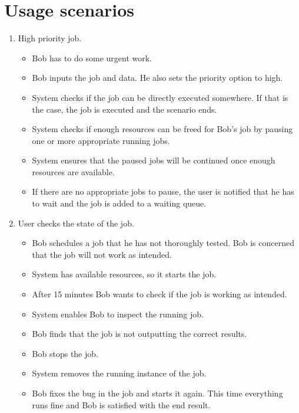 \section{Usage scenarios}
\begin{enumerate}
  \item High priority job.
  \begin{itemize}
    \item Bob has to do some urgent work.
    \item Bob inputs the job and data. He also sets the priority option to high.
    \item System checks if the job can be directly executed somewhere.
    If that is the case, the job is executed and the scenario ends.
    \item System checks if enough resources can be freed for Bob's job by pausing one or more appropriate running jobs.
    \item System ensures that the paused jobs will be continued once enough resources are available.
    \item If there are no appropriate jobs to pause, the user is notified that he has to wait and the job is added to a waiting queue.
  \end{itemize}
  \item User checks the state of the job.
  \begin{itemize}
    \item Bob schedules a job that he has not thoroughly tested.
    Bob is concerned that the job will not work as intended.
    \item System has available resources, so it starts the job.
    \item After 15 minutes Bob wants to check if the job is working as intended.
    \item System enables Bob to inspect the running job.
    \item Bob finds that the job is not outputting the correct results.
    \item Bob stops the job.
    \item System removes the running instance of the job.
    \item Bob fixes the bug in the job and starts it again.
    This time everything runs fine and Bob is satisfied with the end result.
  \end{itemize}
\end{enumerate}
